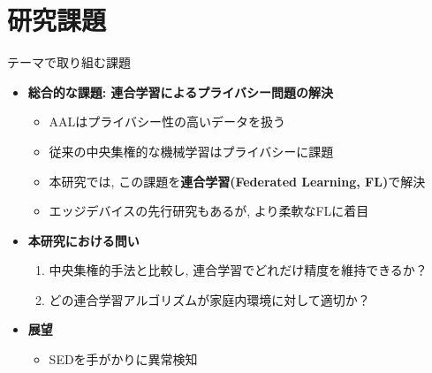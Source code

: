 \documentclass[unicode,12pt,aspectratio=169,dvipdfmx]{beamer}
\begin{document}
\section{研究課題}
\begin{frame}{テーマで取り組む課題}
    \begin{itemize}
        \item \textbf{総合的な課題: 連合学習によるプライバシー問題の解決}
        \begin{itemize}
            \item AALはプライバシー性の高いデータを扱う
            \item 従来の中央集権的な機械学習はプライバシーに課題
            \item 本研究では, この課題を\textbf{連合学習(Federated Learning, FL)}で解決
            \item エッジデバイスの先行研究もある\cite{alsina2017homesound}が, より柔軟なFLに着目
        \end{itemize}
        \item \textbf{本研究における問い}
        \begin{enumerate}
            \item 中央集権的手法と比較し, 連合学習でどれだけ精度を維持できるか？
            \item どの連合学習アルゴリズムが家庭内環境に対して適切か？
        \end{enumerate}
        \item \textbf{展望}
        \begin{itemize}
            \item SEDを手がかりに異常検知
        \end{itemize}
    \end{itemize}
\end{frame}

\end{document}
